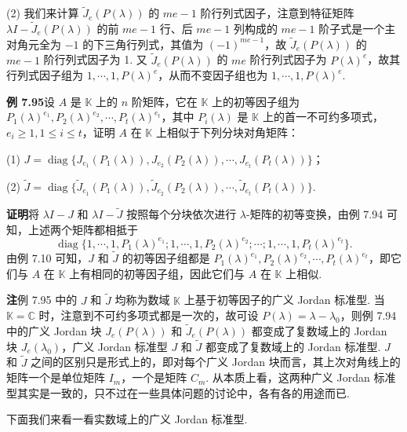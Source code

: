 \documentclass[UTF8,12pt,a4paper,fontset=fandol]{ctexart}
\begin{document}
(2) 我们来计算 $\widetilde J_e(P(\lambda))$ 的 $me-1$ 阶行列式因子，注意到特征矩阵 $\lambda I-\widetilde J_e(P(\lambda))$ 的前 $me-1$ 行、后 $me-1$ 列构成的 $me-1$ 阶子式是一个主对角元全为 $-1$ 的下三角行列式，其值为 $(-1)^{me-1}$，故 $\widetilde J_e(P(\lambda))$ 的 $me-1$ 阶行列式因子为 1. 又 $\widetilde J_e(P(\lambda))$ 的 $me$ 阶行列式因子为 $P(\lambda)^e$，故其行列式因子组为 $1,\cdots,1,P(\lambda)^e$，从而不变因子组也为 $1,\cdots,1,P(\lambda)^e$.

\noindent\textbf{例 7.95}\quad 设 $A$ 是 $\mathbb{K}$ 上的 $n$ 阶矩阵，它在 $\mathbb{K}$ 上的初等因子组为 $P_1(\lambda)^{e_1},P_2(\lambda)^{e_2},\cdots,P_t(\lambda)^{e_t}$，其中 $P_i(\lambda)$ 是 $\mathbb{K}$ 上的首一不可约多项式，$e_i\ge1,1\le i\le t$，证明 $A$ 在 $\mathbb{K}$ 上相似于下列分块对角矩阵：

(1) $J=\operatorname{diag}\{J_{e_1}(P_1(\lambda)),J_{e_2}(P_2(\lambda)),\cdots,J_{e_t}(P_t(\lambda))\}$；

(2) $\widetilde J=\operatorname{diag}\{\widetilde J_{e_1}(P_1(\lambda)),\widetilde J_{e_2}(P_2(\lambda)),\cdots,\widetilde J_{e_t}(P_t(\lambda))\}$.

\noindent\textbf{证明}\quad 将 $\lambda I-J$ 和 $\lambda I-\widetilde J$ 按照每个分块依次进行 $\lambda$-矩阵的初等变换，由例 7.94 可知，上述两个矩阵都相抵于
\[
\operatorname{diag}\{1,\cdots,1,P_1(\lambda)^{e_1};1,\cdots,1,P_2(\lambda)^{e_2};\cdots;1,\cdots,1,P_t(\lambda)^{e_t}\}.
\]
由例 7.10 可知，$J$ 和 $\widetilde J$ 的初等因子组都是 $P_1(\lambda)^{e_1},P_2(\lambda)^{e_2},\cdots,P_t(\lambda)^{e_t}$，即它们与 $A$ 在 $\mathbb{K}$ 上有相同的初等因子组，因此它们与 $A$ 在 $\mathbb{K}$ 上相似.

\noindent\textbf{注}\quad 例 7.95 中的 $J$ 和 $\widetilde J$ 均称为数域 $\mathbb{K}$ 上基于初等因子的广义 Jordan 标准型. 当 $\mathbb{K}=\mathbb{C}$ 时，注意到不可约多项式都是一次的，故可设 $P(\lambda)=\lambda-\lambda_0$，则例 7.94 中的广义 Jordan 块 $J_e(P(\lambda))$ 和 $\widetilde J_e(P(\lambda))$ 都变成了复数域上的 Jordan 块 $J_e(\lambda_0)$，广义 Jordan 标准型 $J$ 和 $\widetilde J$ 都变成了复数域上的 Jordan 标准型. $J$ 和 $\widetilde J$ 之间的区别只是形式上的，即对每个广义 Jordan 块而言，其上次对角线上的矩阵一个是单位矩阵 $I_m$，一个是矩阵 $C_m$. 从本质上看，这两种广义 Jordan 标准型其实是一致的，只不过在一些具体问题的讨论中，各有各的用途而已.

下面我们来看一看实数域上的广义 Jordan 标准型.
\end{document}
